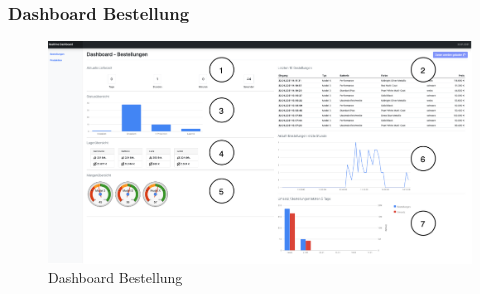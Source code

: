 \subsubsection*{Dashboard Bestellung}
\begin{figure}[h]
    \centering
    \includegraphics[width=1\textwidth]{ausarbeitung-latex/img/DashboardBestellung.png}
    \caption{Dashboard Bestellung}
    \label{fig:DashBest}
\end{figure}
